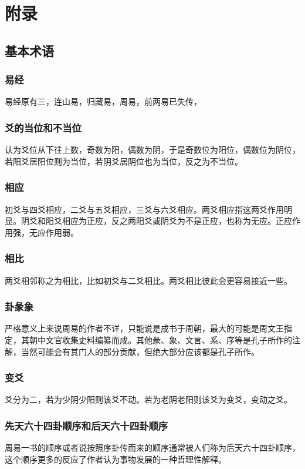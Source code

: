 \documentclass[12pt,oneside]{book}
\begin{document}
\part{附录}
\chapter{基本术语}
\section{易经}
易经原有三，连山易，归藏易，周易，前两易已失传，

\section{爻的当位和不当位}
认为爻位从下往上数，奇数为阳，偶数为阴，于是奇数位为阳位，偶数位为阴位，若阳爻居阳位则为当位，若阴爻居阴位也为当位，反之为不当位。

\section{相应}
初爻与四爻相应，二爻与五爻相应，三爻与六爻相应。两爻相应指这两爻作用明显。阴爻和阳爻相应为正应，反之两阳爻或阴爻为不是正应，也称为无应。正应作用强，无应作用弱。

\section{相比}
两爻相邻称之为相比，比如初爻与二爻相比。两爻相比彼此会更容易接近一些。

\section{卦彖象}
严格意义上来说周易的作者不详，只能说是成书于周朝，最大的可能是周文王指定，其朝中文官收集史料编纂而成。其他彖、象、文言、系、序等是孔子所作的注解，当然可能会有其门人的部分贡献，但绝大部分应该都是孔子所作。

\section{变爻}
爻分为二，若为少阴少阳则该爻不动。若为老阴老阳则该爻为变爻，变动之爻。

\section{先天六十四卦顺序和后天六十四卦顺序}
周易一书的顺序或者说按照序卦传而来的顺序通常被人们称为后天六十四卦顺序，这个顺序更多的反应了作者认为事物发展的一种哲理性解释。
\end{document}
